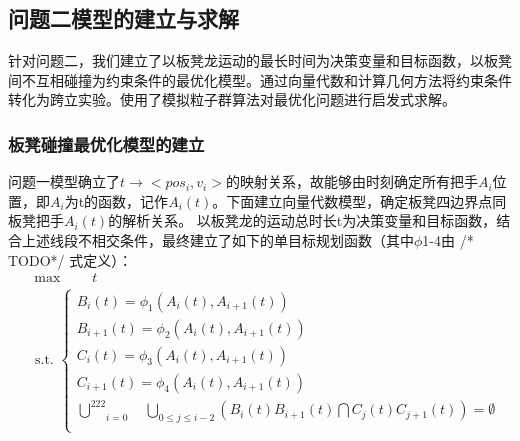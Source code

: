 \documentclass[a4paper]{article}
\begin{document}
	\subsection{问题二模型的建立与求解}
	     针对问题二，我们建立了以板凳龙运动的最长时间为决策变量和目标函数，以板凳间不互相碰撞为约束条件的最优化模型。通过向量代数和计算几何方法将约束条件转化为跨立实验。使用了模拟粒子群算法对最优化问题进行启发式求解。

        \subsubsection{板凳碰撞最优化模型的建立}
        问题一模型确立了$t\to<pos_i,v_i>$的映射关系，故能够由时刻确定所有把手$A_{i}$位置，即$A_{i}$为t的函数，记作$A_{i}(t)$。下面建立向量代数模型，确定板凳四边界点同板凳把手$A_i(t)$的解析关系。
		以板凳龙的运动总时长t为决策变量和目标函数，结合上述线段不相交条件，最终建立了如下的单目标规划函数（其中$\phi$1-4由 /* TODO*/ 式定义）：
		\begin{equation}
			\begin{aligned}
				& \max \quad \quad t \\
				& \text { s.t. }\left\{\begin{array}{l}
                        B_i(t) = \phi_1(A_i(t), A_{i + 1}(t))\\
                        B_{i + 1}(t) = \phi_2(A_i(t), A_{i + 1}(t))\\
                        C_i(t) = \phi_3(A_i(t), A_{i + 1}(t))\\
                        C_{i + 1}(t) = \phi_4(A_i(t), A_{i + 1}(t))\\
               \underset{i=0}{\overset{222}{\bigcup}}\quad \underset{0\leq j \leq i - 2}{\bigcup}(B_i(t)B_{i + 1}(t) \bigcap C_j(t)C_{j + 1}(t)) = \emptyset

  \\

				\end{array}\right.
			\end{aligned}
		\end{equation}
\end{document}
